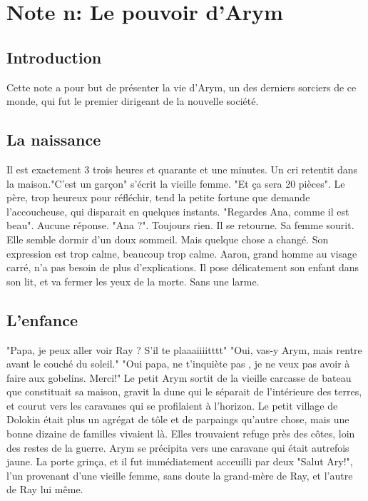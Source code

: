 \section{Note n: Le pouvoir d'Arym}
\subsection{Introduction}
Cette note a pour but de présenter la vie d'Arym, un des derniers sorciers de ce monde, qui fut le premier dirigeant de la nouvelle société.
\subsection{La naissance}
Il est exactement 3 trois heures et quarante et une minutes. Un cri retentit dans la maison."C'est un garçon" s'écrit la vieille femme. "Et ça sera 20 pièces". Le père, trop heureux pour réfléchir, tend la petite fortune que demande l'accoucheuse, qui disparait en quelques instants.
\newline
"Regardes Ana, comme il est beau". Aucune réponse. "Ana ?". Toujours rien. Il se retourne. Sa femme sourit. Elle semble dormir d'un doux sommeil. Mais quelque chose a changé. Son expression est trop calme, beaucoup trop calme. Aaron, grand homme au visage carré, n'a pas besoin de plus d'explications. Il pose délicatement son enfant dans son lit, et va fermer les yeux de la morte. Sans une larme.
\subsection{L'enfance}
"Papa, je peux aller voir Ray ? S'il te plaaaiiiitttt"
\newline
"Oui, vas-y Arym, mais rentre avant le couché du soleil."
\newline
"Oui papa, ne t'inquiète pas , je ne veux pas avoir à faire aux gobelins. Merci!"
\newline
Le petit Arym sortit de la vieille carcasse de bateau que constituait sa maison, gravit la dune qui le séparait de l'intérieure des terres, et courut vers les caravanes qui se profilaient à l'horizon. Le petit village de Dolokin était plus un agrégat de tôle et de parpaings qu'autre chose, mais une bonne dizaine de familles vivaient là. Elles trouvaient refuge près des côtes, loin des restes de la guerre.
\newline
Arym se précipita vers une caravane qui était autrefois jaune. La porte grinça, et il fut immédiatement acceuilli par deux "Salut Ary!", l'un provenant d'une vieille femme, sans doute la grand-mère de Ray, et l'autre de Ray lui même. 
